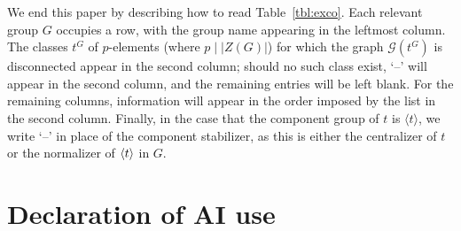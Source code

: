 \documentclass[11pt,a4paper]{amsart}
\theoremstyle{plain}
\theoremstyle{definition}
\theoremstyle{remark}
\theoremstyle{remark}
\theoremstyle{remark}
\theoremstyle{definition}
\newcommand{\GG}{\mathcal{G}}
\DeclarePairedDelimiter{\gen}{\langle}{\rangle}
\begin{document}
We end this paper by describing how to read Table~\ref{tbl:exco}. Each relevant group $G$ occupies a row, with the group name appearing in the leftmost column. The classes $t^G$ of $p$-elements (where $p\mid |Z(G)|$) for which the graph $\GG(t^G)$ is disconnected appear in the second column; should no such class exist, `--' will appear in the second column, and the remaining entries will be left blank. For the remaining columns, information will appear in the order imposed by the list in the second column. Finally, in the case that the component group of $t$ is $\langle t\rangle$, we write `--' in place of the component stabilizer, as this is either the centralizer of $t$ or the normalizer of $\gen{t}$ in $G$.
{\small\section*{Declaration of AI use}
}
\end{document}
